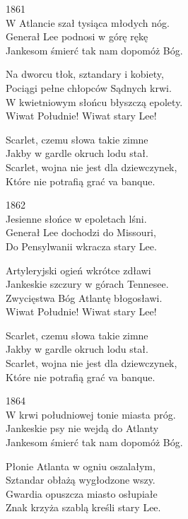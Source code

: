 \begin{text}
    1861\\
    W Atlancie szał tysiąca młodych nóg.\\
    Generał Lee podnosi w górę rękę\\
    Jankesom śmierć tak nam dopomóż Bóg.

    Na dworcu tłok, sztandary i kobiety,\\
    Pociągi pełne chłopców Sądnych krwi.\\
    W kwietniowym słońcu błyszczą epolety.\\
    Wiwat Południe! Wiwat stary Lee!

    \vin Scarlet, czemu słowa takie zimne\\
    \vin Jakby w gardle okruch lodu stał.\\
    \vin Scarlet, wojna nie jest dla dziewczynek,\\
    \vin Które nie potrafią grać va banque.

    1862\\
    Jesienne słońce w epoletach lśni.\\
    Generał Lee dochodzi do Missouri,\\
    Do Pensylwanii wkracza stary Lee.

    Artyleryjski ogień wkrótce zdławi\\
    Jankeskie szczury w górach Tennesee.\\
    Zwycięstwa Bóg Atlantę błogosławi.\\
    Wiwat Południe! Wiwat stary Lee!

    \vin Scarlet, czemu słowa takie zimne\\
    \vin Jakby w gardle okruch lodu stał.\\
    \vin Scarlet, wojna nie jest dla dziewczynek,\\
    \vin Które nie potrafią grać va banque.

    1864\\
    W krwi południowej tonie miasta próg.\\
    Jankeskie psy nie wejdą do Atlanty\\
    Jankesom śmierć tak nam dopomóż Bóg.

    Płonie Atlanta w ogniu oszalałym,\\
    Sztandar obłażą wygłodzone wszy.\\
    Gwardia opuszcza miasto osłupiałe\\
    Znak krzyża szablą kreśli stary Lee.


\end{text}
